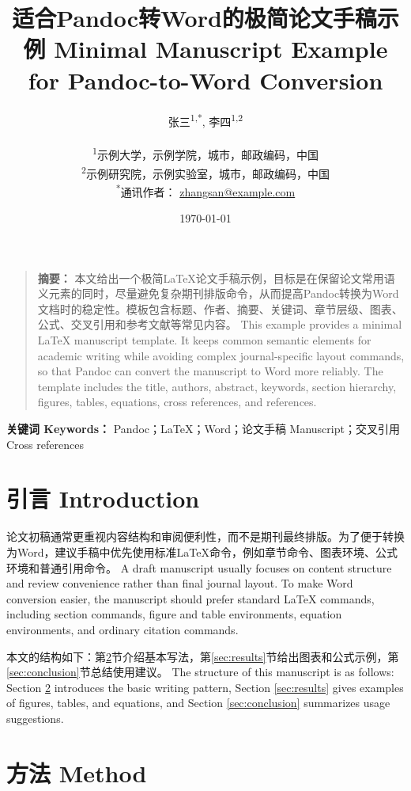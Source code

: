 \documentclass[12pt,a4paper]{article}
\title{适合Pandoc转Word的极简论文手稿示例 Minimal Manuscript Example for Pandoc-to-Word Conversion}
\author{%
  张三\textsuperscript{1,*}, 李四\textsuperscript{1,2}\\[0.5em]
  \parbox{0.8\textwidth}{%
    \centering\small
    \textsuperscript{1}示例大学，示例学院，城市，邮政编码，中国\\[0.25em]
    \textsuperscript{2}示例研究院，示例实验室，城市，邮政编码，中国\\[0.25em]
    \textsuperscript{*}通讯作者：
    \href{mailto:zhangsan@example.com}{zhangsan@example.com}%
  }
}
\date{\today}
\newenvironment{frontmatterblock}
  {\begin{quotation}\small}
  {\end{quotation}}
\renewenvironment{abstract}
    {\begin{frontmatterblock}\noindent\textbf{摘要：}}
    {\end{frontmatterblock}}%
\begin{document}
\maketitle

\begin{abstract}
本文给出一个极简LaTeX论文手稿示例，目标是在保留论文常用语义元素的同时，尽量避免复杂期刊排版命令，从而提高Pandoc转换为Word文档时的稳定性。模板包含标题、作者、摘要、关键词、章节层级、图表、公式、交叉引用和参考文献等常见内容。 This example provides a minimal LaTeX manuscript template. It keeps common semantic elements for academic writing while avoiding complex journal-specific layout commands, so that Pandoc can convert the manuscript to Word more reliably. The template includes the title, authors, abstract, keywords, section hierarchy, figures, tables, equations, cross references, and references.
\end{abstract}

\begingroup
\small
\setlength{\leftskip}{\leftmargini}
\setlength{\rightskip}{\leftmargini}
\noindent\textbf{关键词 Keywords：} Pandoc；LaTeX；Word；论文手稿 Manuscript；交叉引用 Cross references\par
\endgroup

\clearpage

\section{引言 Introduction}
\label{sec:introduction}

论文初稿通常更重视内容结构和审阅便利性，而不是期刊最终排版。为了便于转换为Word，建议手稿中优先使用标准LaTeX命令，例如章节命令、图表环境、公式环境和普通引用命令。 A draft manuscript usually focuses on content structure and review convenience rather than final journal layout. To make Word conversion easier, the manuscript should prefer standard LaTeX commands, including section commands, figure and table environments, equation environments, and ordinary citation commands.

本文的结构如下：第\ref{sec:method}节介绍基本写法，第\ref{sec:results}节给出图表和公式示例，第\ref{sec:conclusion}节总结使用建议。 The structure of this manuscript is as follows: Section \ref{sec:method} introduces the basic writing pattern, Section \ref{sec:results} gives examples of figures, tables, and equations, and Section \ref{sec:conclusion} summarizes usage suggestions.

\section{方法 Method}
\label{sec:method}
\end{document}
